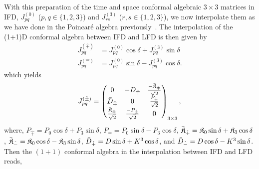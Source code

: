 \documentclass[%
 reprint,
superscriptaddress,
 amsmath,amssymb,
 aps,
]{revtex4-2}
\begin{document}
{\color{red} With this preparation of the time and space conformal algebraic $3\times3$ matrices in IFD, $J^{(0)}_{pq}$ ($p,q\in\{1,2,3\}$) and $J^{(3)}_{rs}$ ($r,s\in\{1,2,3\}$), we now interpolate them as we have done in the Poincar\'e algebra previously~\cite{Ji2001, Ji2025}. The interpolation of the (1+1)D conformal algebra  between IFD and LFD is then given by  
\begin{align}
    J^{(\hat{+})}_{pq}&=J^{(0)}_{pq}\cos{\delta}+J^{(3)}_{pq}\sin{\delta}\\
    J^{(\hat{-})}_{pq}&=J^{(0)}_{pq}\sin{\delta}-J^{(3)}_{pq}\cos{\delta}.
\end{align}
which yields
\begin{align}
    J^{(\hat{\pm})}_{pq}=
  \begin{pmatrix}
  0&-\Bar{D}_{\hat{\mp}}&\frac{-\Bar{\mathfrak{K}}_{\hat{\mp}}}{\sqrt{2}}\\
  \Bar{D}_{\hat{\mp}}&0&\frac{P_{\hat{\pm}}}{\sqrt{2}}\\
    \frac{\Bar{\mathfrak{K}}_{\hat{\mp}}}{\sqrt{2}}&\frac{-P_{\hat{\pm}}}{\sqrt{2}}&0  
  \end{pmatrix}_{3\times3},
\end{align}
where, $P_{\hat{+}}=P_0\cos{\delta}+P_3\sin{\delta}$, $P_{\hat{-}}=P_0\sin{\delta}-P_3\cos{\delta}$, $\Bar{\mathfrak{K}}_{\hat{+}}=\mathfrak{K}_0\sin{\delta}+\mathfrak{K}_3\cos{\delta}$, $\Bar{\mathfrak{K}}_{\hat{-}}=\mathfrak{K}_0\cos{\delta}-\mathfrak{K}_3\sin{\delta}$, $\Bar{D}_{\hat{+}}=D\sin\delta+K^{3}\cos\delta$, and $\Bar{D}_{\hat{-}}=D\cos\delta-K^{3}\sin\delta$.}
Then the $(1+1)$ conformal algebra in the interpolation between IFD and LFD reads,
\end{document}
